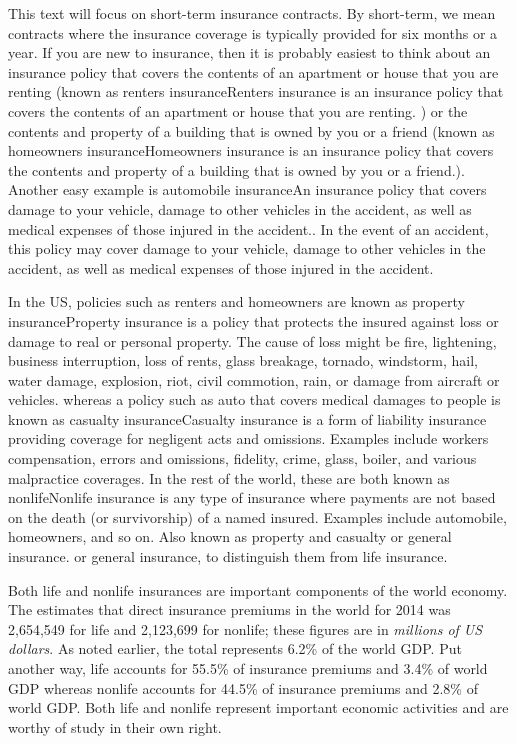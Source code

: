 \documentclass[]{book}
\theoremstyle{definition}
\theoremstyle{definition}
\theoremstyle{definition}
\theoremstyle{remark}
\begin{document}
This text will focus on short-term insurance contracts. By short-term,
we mean contracts where the insurance coverage is typically provided for
six months or a year. If you are new to insurance, then it is probably
easiest to think about an insurance policy that covers the contents of
an apartment or house that you are renting (known as renters
insurance{Renters insurance is an insurance policy that covers the
contents of an apartment or house that you are renting.} ) or the
contents and property of a building that is owned by you or a friend
(known as homeowners insurance{Homeowners insurance is an insurance
policy that covers the contents and property of a building that is owned
by you or a friend.}). Another easy example is automobile insurance{An
insurance policy that covers damage to your vehicle, damage to other
vehicles in the accident, as well as medical expenses of those injured
in the accident.}. In the event of an accident, this policy may cover
damage to your vehicle, damage to other vehicles in the accident, as
well as medical expenses of those injured in the accident.

In the US, policies such as renters and homeowners are known as property
insurance{Property insurance is a policy that protects the insured
against loss or damage to real or personal property. The cause of loss
might be fire, lightening, business interruption, loss of rents, glass
breakage, tornado, windstorm, hail, water damage, explosion, riot, civil
commotion, rain, or damage from aircraft or vehicles.} whereas a policy
such as auto that covers medical damages to people is known as casualty
insurance{Casualty insurance is a form of liability insurance providing
coverage for negligent acts and omissions. Examples include workers
compensation, errors and omissions, fidelity, crime, glass, boiler, and
various malpractice coverages.} In the rest of the world, these are both
known as nonlife{Nonlife insurance is any type of insurance where
payments are not based on the death (or survivorship) of a named
insured. Examples include automobile, homeowners, and so on. Also known
as property and casualty or general insurance.} or general insurance, to
distinguish them from life insurance.

Both life and nonlife insurances are important components of the world
economy. The \citet{III2016} estimates that direct insurance premiums in
the world for 2014 was 2,654,549 for life and 2,123,699 for nonlife;
these figures are in \emph{millions of US dollars}. As noted earlier,
the total represents 6.2\% of the world GDP. Put another way, life
accounts for 55.5\% of insurance premiums and 3.4\% of world GDP whereas
nonlife accounts for 44.5\% of insurance premiums and 2.8\% of world
GDP. Both life and nonlife represent important economic activities and
are worthy of study in their own right.
\end{document}
